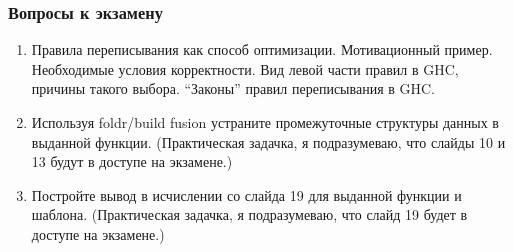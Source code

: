 \documentclass[
    aspectratio=169,
]{beamer}
\begin{document}
\begin{frame}
    \frametitle{Вопросы к экзамену}

    \begin{enumerate}
        \item Правила переписывания как способ оптимизации.
              Мотивационный пример.
              Необходимые условия корректности.
              Вид левой части правил в GHC, причины такого выбора.
              \enquote{Законы} правил переписывания в GHC.
        \item Используя foldr/build fusion устраните промежуточные структуры данных в выданной функции.
              {\footnotesize (Практическая задачка, я подразумеваю, что слайды 10 и 13 будут в доступе на экзамене.)}
        \item Постройте вывод в исчислении со слайда 19 для выданной функции и шаблона.
              {\footnotesize (Практическая задачка, я подразумеваю, что слайд 19 будет в доступе на экзамене.)}
    \end{enumerate}

\end{frame}
\end{document}
